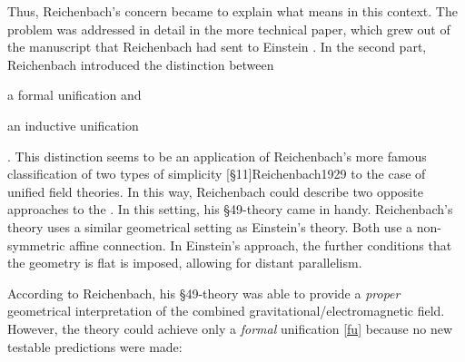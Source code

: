 \documentclass[draft]{article}
\begin{document}
Thus, Reichenbach's concern became to explain what  means in this context. The problem was addressed in detail in the more technical paper, which grew out of the manuscript that Reichenbach had sent to Einstein \citep{Reichenbach1929a}.  In the second part, Reichenbach introduced the distinction between  \begin{inparaenum}[(a)] \item\label{fu} a formal unification and \item\label{iu} an inductive unification \end{inparaenum}. This distinction seems to be an application of  Reichenbach's more famous classification of two types of simplicity [\S11]{Reichenbach1929} to the case of unified field theories. In this way, Reichenbach could describe two opposite approaches to the \uftp. In this setting, his \S49-theory came in handy. Reichenbach's theory uses a similar geometrical setting as Einstein's theory. Both use a non-symmetric affine connection. In Einstein's approach, the further conditions that the geometry is flat is imposed, allowing for distant parallelism.

According to Reichenbach, his \S49-theory was able to provide a \emph{proper} geometrical interpretation of the combined gravitational/electromagnetic field. However, the theory could achieve only a \emph{formal} unification \cref{fu} because no new testable predictions were made:
\end{document}
